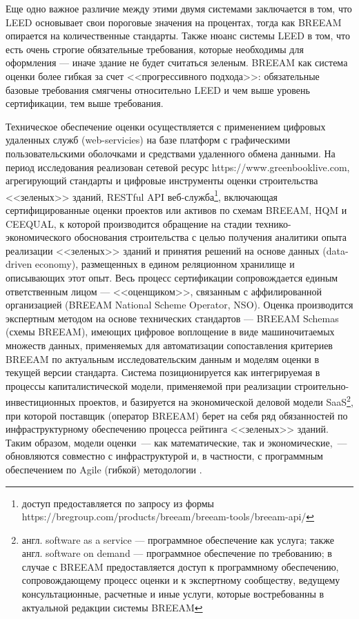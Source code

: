 Еще одно важное различие между этими двумя системами заключается в том, что LEED основывает свои пороговые значения на процентах, тогда как BREEAM опирается на количественные стандарты.
Также нюанс системы LEED в том, что есть очень строгие обязательные требования, которые необходимы для оформления — иначе здание не будет считаться зеленым.
BREEAM как система оценки более гибкая за счет <<прогрессивного подхода>>: обязательные базовые требования смягчены относительно LEED и чем выше уровень сертификации, тем выше требования.

Техническое обеспечение оценки осуществляется с применением цифровых удаленных служб (web-servicies) на базе платформ с графическими пользовательскими оболочками и средствами удаленного обмена данными.
На период исследования реализован сетевой ресурс https://www.greenbooklive.com, агрегирующий стандарты и цифровые инструменты оценки строительства <<зеленых>> зданий,
RESTful API веб-служба\footnote{доступ предоставляется по запросу из формы https://bregroup.com/products/breeam/breeam-tools/breeam-api/},
включающая сертифицированные оценки проектов или активов по схемам BREEAM, HQM и CEEQUAL, к которой производится обращение на стадии
технико-экономического обоснования строительства с целью получения аналитики опыта реализации <<зеленых>> зданий и принятия решений на основе данных (data-driven economy),
размещенных в едином реляционном хранилище и описывающих этот опыт.
Весь процесс сертификации сопровождается единым ответственным лицом --- <<оценщиком>>, связанным с аффилированной организацией (BREEAM National Scheme Operator, NSO).
Оценка производится экспертным методом на основе технических стандартов --- BREEAM Schemas (схемы BREEAM), имеющих цифровое воплощение в виде машиночитаемых множеств данных,
применяемых для автоматизации сопоставления критериев BREEAM по актуальным исследовательским данным и моделям оценки в текущей версии стандарта.
Система позиционируется как интегрируемая в процессы капиталистической модели, применяемой при реализации строительно-инвестиционных проектов,
и базируется на экономической деловой модели SaaS\footnote{англ. software as a service — программное обеспечение как услуга; также англ. software on demand — программное обеспечение по требованию;
    в случае с BREEAM предоставляется доступ к программному обеспечению, сопровождающему процесс оценки и к экспертному сообществу, ведущему консультационные,
    расчетные и иные услуги, которые востребованны в актуальной редакции системы BREEAM},
при которой поставщик (оператор BREEAM) берет на себя ряд обязанностей по инфраструктурному обеспечению процесса  рейтинга <<зеленых>> зданий.
Таким образом, модели оценки~--- как математические, так и экономические,~--- обновляются совместно с инфраструктурой и, в частности, с программным обеспечением по Agile (гибкой) методологии \cite{method_GB_BREEAM}.
